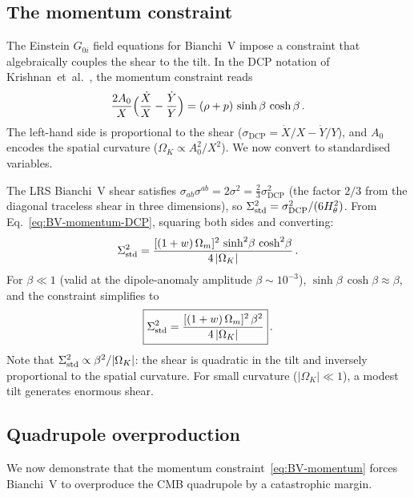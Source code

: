 \subsection{The momentum constraint}\label{sec:BV-momentum}

The Einstein $G_{0i}$ field equations for Bianchi~V impose a
constraint that algebraically couples the shear to the tilt.
In the DCP notation of
Krishnan~et~al.~\cite{Krishnan2022,Krishnan2023}, the
momentum constraint reads
\begin{equation}\label{eq:BV-momentum-DCP}
\frac{2A_0}{X}\Bigl(\frac{\dot{X}}{X}
  - \frac{\dot{Y}}{Y}\Bigr)
= (\rho + p)\,\sinh\beta\,\cosh\beta\,.
\end{equation}
The left-hand side is proportional to the shear
($\sigma_{\mathrm{DCP}} = \dot{X}/X - \dot{Y}/Y$), and
$A_0$ encodes the spatial curvature ($\Omega_K \propto
A_0^2/X^2$).  We now convert to standardised variables.

The LRS Bianchi~V shear satisfies
$\sigma_{ab}\sigma^{ab} = 2\sigma^2 = \frac{2}{3}\sigma_{\mathrm{DCP}}^2$
(the factor $2/3$ from the diagonal traceless shear in three
dimensions), so $\Sigma^2_{\mathrm{std}} = \sigma_{\mathrm{DCP}}^2/(6H_\theta^2)$.
From Eq.~\eqref{eq:BV-momentum-DCP}, squaring both sides and
converting:
\begin{equation}\label{eq:BV-Sig2-exact}
\Sigma^2_{\mathrm{std}}
= \frac{[(1+w)\,\Omega_m]^2\,\sinh^2\!\beta\,\cosh^2\!\beta}
       {4\,|\Omega_K|}\,.
\end{equation}
For $\beta \ll 1$ (valid at the dipole-anomaly amplitude
$\beta \sim 10^{-3}$), $\sinh\beta\,\cosh\beta \approx \beta$,
and the constraint simplifies to
\begin{equation}\label{eq:BV-momentum}
\boxed{
\Sigma^2_{\mathrm{std}}
= \frac{[(1+w)\,\Omega_m]^2\,\beta^2}{4\,|\Omega_K|}
}\,.
\end{equation}
Note that $\Sigma^2_{\mathrm{std}} \propto \beta^2/|\Omega_K|$: the shear is
quadratic in the tilt and inversely proportional to the spatial
curvature.  For small curvature ($|\Omega_K| \ll 1$), a modest
tilt generates enormous shear.


\subsection{Quadrupole overproduction}\label{sec:BV-quad}

We now demonstrate that the momentum
constraint~\eqref{eq:BV-momentum} forces Bianchi~V to
overproduce the CMB quadrupole by a catastrophic margin.


